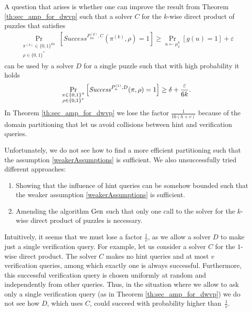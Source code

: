 A question that arises is whether one can improve the result from Theorem \ref{th:sec_amp_for_dwvp}
such that a solver $C$ for the $k$-wise direct product of puzzles that satisfies
\begin{align}
    \label{weakerAssumptions}
    \underset{\substack{\pi^{(k)} \in \{0,1\}^{kn} \\ \rho \in \{0,1\}^{*}}}{\Pr}\left[\mathit{Success}^{P_{kn}^{(g)}, C}(\pi^{(k)}, \rho) = 1\right]
    \geq \underset{u \leftarrow \mu_\delta^k}{\Pr}[g(u) = 1] + \varepsilon
\end{align}
can be used by a solver $D$ for a single puzzle such that with high probability it holds
  \begin{align}
    \underset{\substack{\pi \in \{0,1\}^{n} \\ \rho \in \{0,1\}^{*}}}
    {\Pr}\left[\operatorname{\mathit{Success}}^{P_{n}^{(1)},D}(\pi, \rho) = 1\right] \geq \delta + \frac{\varepsilon}{6k}.
  \end{align}
In Theorem \ref{th:sec_amp_for_dwvp} we lose the factor $\frac{1}{16(h+v)}$ because of the domain partitioning that let us avoid collisions between hint and verification queries.

Unfortunately, we do not see how to find a more efficient partitioning such that the assumption \eqref{weakerAssumptions} is sufficient.
We also unsuccessfully tried different approaches:
\begin{enumerate}[-]
  \item Showing that the influence of hint queries can be somehow bounded such that the weaker assumption \eqref{weakerAssumptions} is sufficient.
  \item Amending the algorithm $\operatorname{\text{Gen}}$ such that only one call to the solver for the $k$-wise direct product of puzzles is necessary.
\end{enumerate}

Intuitively, it seems that we must lose a factor $\frac{1}{v}$, as we allow a solver $D$ to make just a single verification query.
For example, let us consider a solver $C$ for the $1$-wise direct product. The solver $C$ makes no hint queries and at most $v$ verification queries,
among which exactly one is always successful.
Furthermore, this successful verification query is chosen uniformly at random and independently from other queries.
Thus, in the situation where we allow to ask only a single verification query (as in Theorem \ref{th:sec_amp_for_dwvp})
we do not see how $D$, which uses $C$, could succeed with probability higher than~$\frac{1}{v}$.

